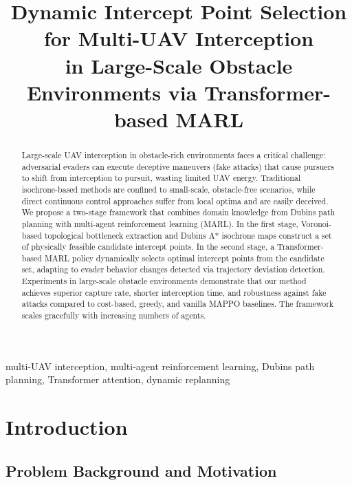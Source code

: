 \documentclass[10pt,conference]{IEEEtran}
\title{Dynamic Intercept Point Selection for Multi-UAV Interception\\in Large-Scale Obstacle Environments via Transformer-based MARL}
\author{
\IEEEauthorblockN{Author Names}
\IEEEauthorblockA{Affiliation\\Email}
}
\begin{document}
\maketitle

\begin{abstract}
Large-scale UAV interception in obstacle-rich environments faces a critical challenge: adversarial evaders can execute deceptive maneuvers (fake attacks) that cause pursuers to shift from interception to pursuit, wasting limited UAV energy. Traditional isochrone-based methods are confined to small-scale, obstacle-free scenarios, while direct continuous control approaches suffer from local optima and are easily deceived. We propose a two-stage framework that combines domain knowledge from Dubins path planning with multi-agent reinforcement learning (MARL). In the first stage, Voronoi-based topological bottleneck extraction and Dubins A* isochrone maps construct a set of physically feasible candidate intercept points. In the second stage, a Transformer-based MARL policy dynamically selects optimal intercept points from the candidate set, adapting to evader behavior changes detected via trajectory deviation detection. Experiments in large-scale obstacle environments demonstrate that our method achieves superior capture rate, shorter interception time, and robustness against fake attacks compared to cost-based, greedy, and vanilla MAPPO baselines. The framework scales gracefully with increasing numbers of agents.
\end{abstract}

\begin{IEEEkeywords}
multi-UAV interception, multi-agent reinforcement learning, Dubins path planning, Transformer attention, dynamic replanning
\end{IEEEkeywords}

\section{Introduction}

\subsection{Problem Background and Motivation}
\end{document}
